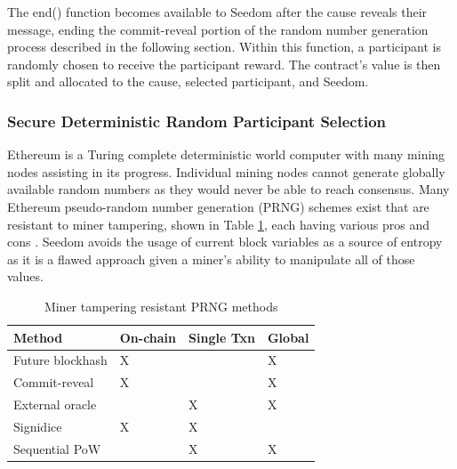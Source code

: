 \documentclass[11pt]{article}
\begin{document}
The end() function becomes available to Seedom after the cause reveals their message, ending the commit-reveal portion of the random number generation process described in the following section. Within this function, a participant is randomly chosen to receive the participant reward. The contract's value is then split and allocated to the cause, selected participant, and Seedom.

\subsubsection{Secure Deterministic Random Participant Selection}
\label{sec:secureDeterministicRandomParticipantSelection}

Ethereum is a Turing complete deterministic world computer with many mining nodes assisting in its progress. Individual mining nodes cannot generate globally available random numbers as they would never be able to reach consensus. Many Ethereum pseudo-random number generation (PRNG) schemes exist that are resistant to miner tampering, shown in Table \ref{tab:minerTamperingResistantPrngMethods}, each having various pros and cons \cite{12}. Seedom avoids the usage of current block variables as a source of entropy as it is a flawed approach given a miner's ability to manipulate all of those values.

\begin{table}[H]
\begin{center}
\begin{tabular}{| p{10em} | l | l | l |}
\hline
\textbf{Method} & \textbf{On-chain} & \textbf{Single Txn} & \textbf{Global} \\ \hline
Future blockhash & X & & X \\ \hline
Commit-reveal & X & & X \\ \hline
External oracle & & X & X \\ \hline
Signidice & X & X & \\ \hline
Sequential PoW & & X & X \\ \hline
\end{tabular}
\caption{Miner tampering resistant PRNG methods}
\label{tab:minerTamperingResistantPrngMethods}
\end{center}
\end{table}
\end{document}
